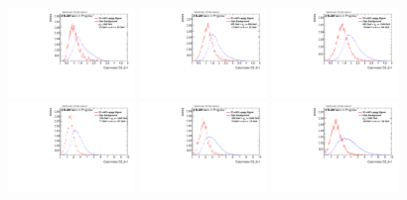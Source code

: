 \begin{figure}
\bigskip
\includegraphics[width=0.3\textwidth]{sascha_input/Appendix/Distributions/w/distributions/beta1/h_recoJet_D2_bin1.pdf} \hspace{1mm}
\includegraphics[width=0.3\textwidth]{sascha_input/Appendix/Distributions/w/distributions/beta1/h_recoJet_D2_bin2.pdf} \hspace{1mm}
\includegraphics[width=0.3\textwidth]{sascha_input/Appendix/Distributions/w/distributions/beta1/h_recoJet_D2_bin3.pdf} 
\bigskip
\includegraphics[width=0.3\textwidth]{sascha_input/Appendix/Distributions/w/distributions/beta1/h_recoJet_D2_bin4.pdf} \hspace{1mm}
\includegraphics[width=0.3\textwidth]{sascha_input/Appendix/Distributions/w/distributions/beta1/h_recoJet_D2_bin5.pdf} \hspace{1mm}
\includegraphics[width=0.3\textwidth]{sascha_input/Appendix/Distributions/w/distributions/beta1/h_recoJet_D2_bin6.pdf}

\end{figure}
